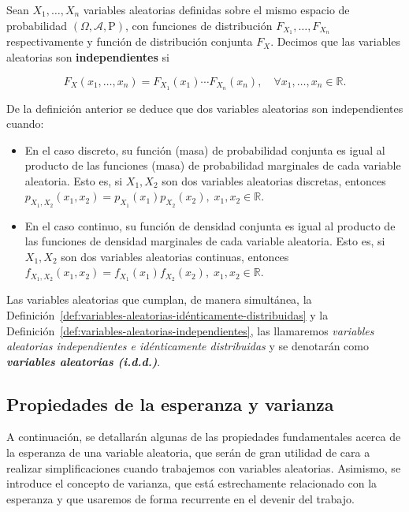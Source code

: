\begin{definicion}\label{def:variables-aleatorias-independientes}
    Sean $X_1, \ldots, X_n$ variables aleatorias definidas sobre el mismo espacio de probabilidad $(\Omega, \mathcal{A}, \mathrm{P})$, con funciones de distribución $F_{X_1}, \ldots, F_{X_n}$ respectivamente y función de distribución conjunta $F_{X}$. Decimos que las variables aleatorias son \textbf{independientes} si

    \[ F_X(x_1, \ldots, x_n) = F_{X_1}(x_1) \cdots F_{X_n}(x_n), \quad \forall x_1, \ldots, x_n \in \mathbb{R}. \]
\end{definicion}

\begin{observacion}
    De la definición anterior se deduce que dos variables aleatorias son independientes cuando:
    \begin{itemize}
        \item En el caso discreto, su función (masa) de probabilidad conjunta es igual al producto de las funciones (masa) de probabilidad marginales de cada variable aleatoria. Esto es, si $X_1, X_2$ son dos variables aleatorias discretas, entonces $p_{X_1, X_2}(x_1, x_2) = p_{X_1}(x_1)p_{X_2}(x_2), \; x_1, x_2 \in \mathbb{R}$.
        \item En el caso continuo, su función de densidad conjunta es igual al producto de las funciones de densidad marginales de cada variable aleatoria. Esto es, si $X_1, X_2$ son dos variables aleatorias continuas, entonces $f_{X_1, X_2}(x_1, x_2) = f_{X_1}(x_1)f_{X_2}(x_2), \; x_1, x_2 \in \mathbb{R}$.
    \end{itemize}
\end{observacion}

\begin{definicion}
    Las variables aleatorias que cumplan, de manera simultánea, la Definición~\ref{def:variables-aleatorias-idénticamente-distribuidas} y la Definición~\ref{def:variables-aleatorias-independientes}, las llamaremos \emph{variables aleatorias independientes e idénticamente distribuidas} y se denotarán como \textbf{\emph{variables aleatorias (i.d.d.)}}.
\end{definicion}

\subsection{Propiedades de la esperanza y varianza}
A continuación, se detallarán algunas de las propiedades fundamentales acerca de la esperanza de una variable aleatoria, que serán de gran utilidad de cara a realizar simplificaciones cuando trabajemos con variables aleatorias. Asimismo, se introduce el concepto de varianza, que está estrechamente relacionado con la esperanza y que usaremos de forma recurrente en el devenir del trabajo.

